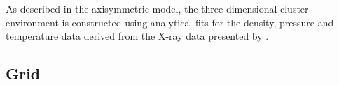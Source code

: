 
As described in the axisymmetric model, the three-dimensional cluster environment is constructed using analytical fits for the density, pressure and temperature data derived from the X-ray data presented by \citet{david01}.
 




\subsection{Grid}
